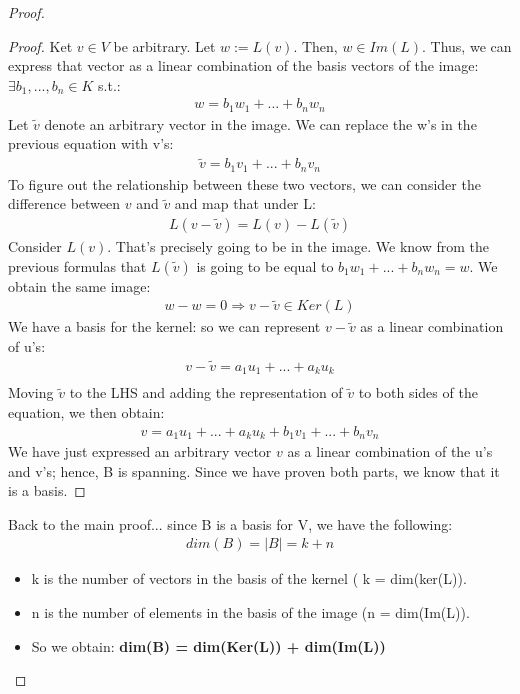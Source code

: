 \documentclass[a4paper, 12pt]{article}
\theoremstyle{definition}
\theoremstyle{definition}
\theoremstyle{definition}
\theoremstyle{definition}
\begin{document}
{\begin{proof}
\begin{proof}
		\newline 
		\newline 
		Ket $v \in V$ be arbitrary. Let $w := L(v)$. Then, $w \in Im(L)$. Thus, we can express that vector as a linear combination of the basis vectors of the image: $\exists b_1, ..., b_n \in K$ s.t.: 
		\begin{align*}
			w = b_1 w_1 + ... + b_n w_n 
		\end{align*}
		Let $\tilde{v}$ denote an arbitrary vector in the image. We can replace the w's in the previous equation with v's: 
		\begin{align*}
			\tilde{v} = b_1 v_1 + ... + b_n v_n 
		\end{align*}
		To figure out the relationship between these two vectors, we can consider the difference between $v$ and $\tilde{v}$ and map that under L: 
		\begin{align*}
			L(v - \tilde{v}) = L(v) - L(\tilde{v}) 
		\end{align*}
		Consider $L(v)$. That's precisely going to be in the image. We know from the previous formulas that $L(\tilde{v})$ is going to be equal to $b_1 w_1 + ... + b_n w_n = w$. We obtain the same image: 
		\begin{align*}
			w - w = 0 \Rightarrow v - \tilde{v} \in Ker(L) 
		\end{align*}
		We have a basis for the kernel: so we can represent $v-\tilde{v}$ as a linear combination of u's: 
		\begin{align*}
			v - \tilde{v} = a_1 u_1 + ... + a_k u_k \\
		\end{align*}
		Moving $\tilde{v}$ to the LHS and adding the representation of $\tilde{v}$ to both sides of the equation, we then obtain: 
		\begin{align*}
			v = a_1 u_1 + ... + a_k u_k + b_1 v_1 + ... + b_n v_n 
		\end{align*}
		We have just expressed an arbitrary vector $v$ as a linear combination of the u's and v's; hence, B is spanning. Since we have proven both parts, we know that it is a basis. 
	\end{proof}
	Back to the main proof... since B is a basis for V, we have the following: 
	\begin{align*}
		dim(B) = |B | = k + n 
	\end{align*}
	\begin{itemize}
		\item k is the number of vectors in the basis of the kernel ( k = dim(ker(L)). 
		\item n is the number of elements in the basis of the image (n = dim(Im(L)). 
		\item So we obtain: \textbf{dim(B) = dim(Ker(L)) + dim(Im(L))}
	\end{itemize}
\end{proof}

}
\end{document}
